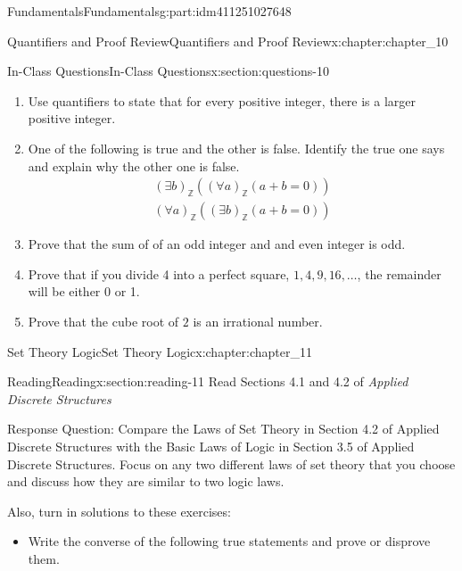 \documentclass[oneside,10pt,]{book}
\numberwithin{equation}{section}
\begin{document}
\begin{partptx}{Fundamentals}{}{Fundamentals}{}{}{g:part:idm411251027648}
\begin{chapterptx}{Quantifiers and Proof Review}{}{Quantifiers and Proof Review}{}{}{x:chapter:chapter_10}
\begin{sectionptx}{In-Class Questions}{}{In-Class Questions}{}{}{x:section:questions-10}
\begin{enumerate}[label=\arabic*.]
\begin{enumerate}[label=(\alph*)]
\item{}There is no number between a number and one more than that number.%
\end{enumerate}
%
\item{}Use quantifiers to state that for every positive integer, there is a larger positive integer.%
\item{}One of the following is true and the other is false.  Identify the true one says and explain why the other one is false.%
\begin{gather*}
(\exists  b)_{\mathbb{Z}} ((\forall a)_{\mathbb{Z}}(a + b = 0))\\
(\forall  a)_{\mathbb{Z}} ((\exists b)_{\mathbb{Z}}(a + b = 0))
\end{gather*}
%
\item{}Prove that the sum of of an odd integer and and even integer is odd.%
\item{}Prove that if you divide 4 into a perfect square, \(1, 4, 9, 16, \dots\), the remainder will be either 0 or 1.%
\item{}Prove that the cube root of \(2\) is an irrational number.%
\end{enumerate}
%
\end{sectionptx}
\end{chapterptx}
%
\typeout{************************************************}
\typeout{************************************************}
%
\begin{chapterptx}{Set Theory Logic}{}{Set Theory Logic}{}{}{x:chapter:chapter_11}
%
%
\typeout{************************************************}
\typeout{************************************************}
%
\begin{sectionptx}{Reading}{}{Reading}{}{}{x:section:reading-11}
Read Sections 4.1  and 4.2 of \emph{Applied Discrete Structures}%
\par
Response Question: Compare the Laws of Set Theory in Section 4.2 of Applied Discrete Structures with the Basic Laws of Logic in Section 3.5 of Applied Discrete Structures.  Focus on any two different laws of set theory that you choose and discuss how they are similar to two logic laws.%
\par
Also, turn in solutions to these exercises:%
\begin{itemize}[label=\textbullet]
\item{}Write the converse of the following true statements and prove or disprove them.%
\begin{enumerate}[label=(\alph*)]

\end{enumerate}
\end{itemize}
\end{sectionptx}
\end{chapterptx}
\end{partptx}
\end{document}

